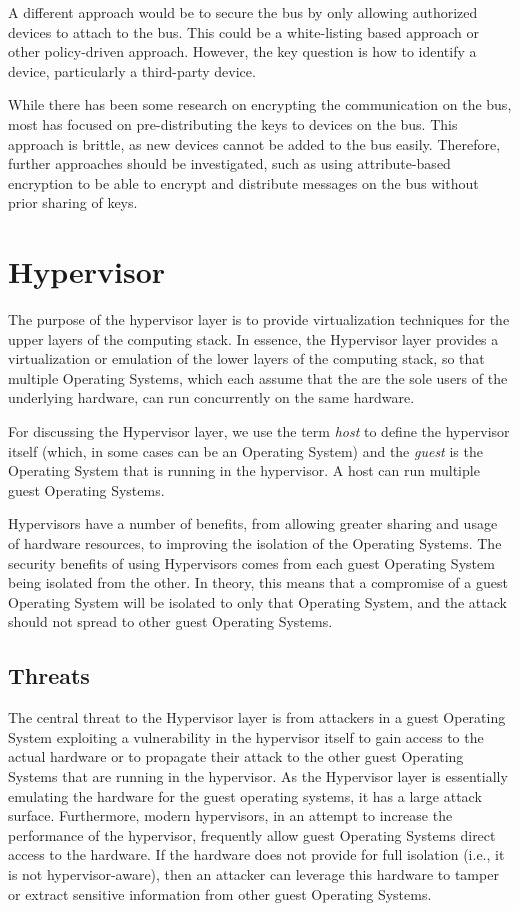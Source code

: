 \documentclass[11pt,letterpaper]{article}
\begin{document}
A different approach would be to secure the bus by only allowing
authorized devices to attach to the bus. This could be a white-listing
based approach or other policy-driven approach. However, the key
question is how to identify a device, particularly a third-party
device.

While there has been some research on encrypting the communication on
the bus, most has focused on pre-distributing the keys to devices on
the bus. This approach is brittle, as new devices cannot be added to
the bus easily. Therefore, further approaches should be investigated,
such as using attribute-based encryption to be able to encrypt and
distribute messages on the bus without prior sharing of keys.

\section{Hypervisor}

The purpose of the hypervisor layer is to provide virtualization
techniques for the upper layers of the computing stack. In essence,
the Hypervisor layer provides a virtualization or emulation of the
lower layers of the computing stack, so that multiple Operating
Systems, which each assume that the are the sole users of the
underlying hardware, can run concurrently on the same hardware.

For discussing the Hypervisor layer, we use the term \emph{host} to
define the hypervisor itself (which, in some cases can be an Operating
System) and the \emph{guest} is the Operating System that is running
in the hypervisor. A host can run multiple guest Operating Systems.

Hypervisors have a number of benefits, from allowing greater sharing
and usage of hardware resources, to improving the isolation of the
Operating Systems. The security benefits of using Hypervisors comes
from each guest Operating System being isolated from the other. In
theory, this means that a compromise of a guest Operating System will
be isolated to only that Operating System, and the attack should not
spread to other guest Operating Systems.

\subsection{Threats}

The central threat to the Hypervisor layer is from attackers in a
guest Operating System exploiting a vulnerability in the hypervisor
itself to gain access to the actual hardware or to propagate their
attack to the other guest Operating Systems that are running in the
hypervisor. As the Hypervisor layer is essentially emulating the
hardware for the guest operating systems, it has a large attack
surface. Furthermore, modern hypervisors, in an attempt to increase
the performance of the hypervisor, frequently allow guest Operating
Systems direct access to the hardware. If the hardware does not
provide for full isolation (i.e., it is not hypervisor-aware), then an
attacker can leverage this hardware to tamper or extract sensitive
information from other guest Operating Systems.
\end{document}
